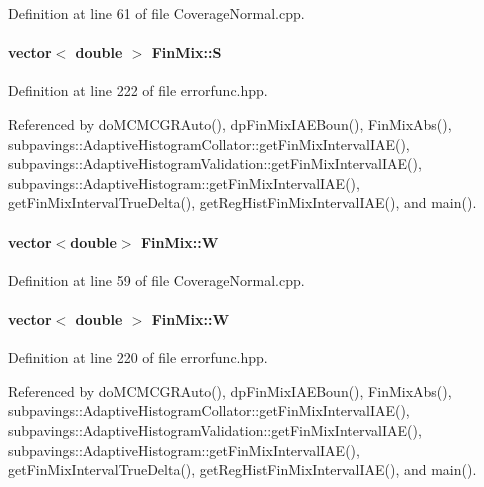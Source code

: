 \-Definition at line 61 of file \-Coverage\-Normal.\-cpp.

\hypertarget{structFinMix_ac96c7d4bec4e00d981a609a4ffd0c3d3}{
\paragraph[{\-S}]{\setlength{\rightskip}{0pt plus 5cm}vector$<$ double $>$ {\bf \-Fin\-Mix\-::\-S}}}\label{structFinMix_ac96c7d4bec4e00d981a609a4ffd0c3d3}


\-Definition at line 222 of file errorfunc.\-hpp.



\-Referenced by do\-M\-C\-M\-C\-G\-R\-Auto(), dp\-Fin\-Mix\-I\-A\-E\-Boun(), \-Fin\-Mix\-Abs(), subpavings\-::\-Adaptive\-Histogram\-Collator\-::get\-Fin\-Mix\-Interval\-I\-A\-E(), subpavings\-::\-Adaptive\-Histogram\-Validation\-::get\-Fin\-Mix\-Interval\-I\-A\-E(), subpavings\-::\-Adaptive\-Histogram\-::get\-Fin\-Mix\-Interval\-I\-A\-E(), get\-Fin\-Mix\-Interval\-True\-Delta(), get\-Reg\-Hist\-Fin\-Mix\-Interval\-I\-A\-E(), and main().

\hypertarget{structFinMix_ace04e4bbc987bf52978775e974845fcc}{
\paragraph[{\-W}]{\setlength{\rightskip}{0pt plus 5cm}vector$<$double$>$ {\bf \-Fin\-Mix\-::\-W}}}\label{structFinMix_ace04e4bbc987bf52978775e974845fcc}


\-Definition at line 59 of file \-Coverage\-Normal.\-cpp.

\hypertarget{structFinMix_a5e3e0c0a40f75ec6df8e4513828342be}{
\paragraph[{\-W}]{\setlength{\rightskip}{0pt plus 5cm}vector$<$ double $>$ {\bf \-Fin\-Mix\-::\-W}}}\label{structFinMix_a5e3e0c0a40f75ec6df8e4513828342be}


\-Definition at line 220 of file errorfunc.\-hpp.



\-Referenced by do\-M\-C\-M\-C\-G\-R\-Auto(), dp\-Fin\-Mix\-I\-A\-E\-Boun(), \-Fin\-Mix\-Abs(), subpavings\-::\-Adaptive\-Histogram\-Collator\-::get\-Fin\-Mix\-Interval\-I\-A\-E(), subpavings\-::\-Adaptive\-Histogram\-Validation\-::get\-Fin\-Mix\-Interval\-I\-A\-E(), subpavings\-::\-Adaptive\-Histogram\-::get\-Fin\-Mix\-Interval\-I\-A\-E(), get\-Fin\-Mix\-Interval\-True\-Delta(), get\-Reg\-Hist\-Fin\-Mix\-Interval\-I\-A\-E(), and main().



